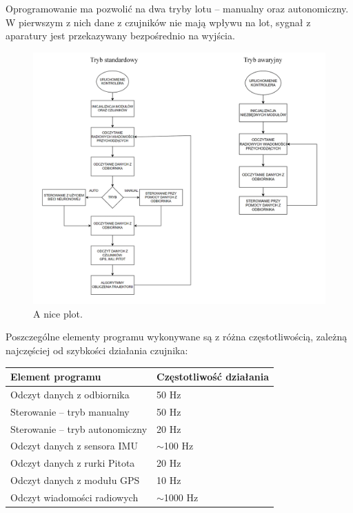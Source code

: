 \documentclass[12pt, a4paper]{article}
\begin{document}
Oprogramowanie ma pozwolić na dwa tryby lotu – manualny oraz autonomiczny. W pierwszym z nich dane z czujników nie mają wpływu na lot, sygnał z aparatury jest przekazywany bezpośrednio na wyjścia.
 
    \begin{figure}[ht]
    \centering
    \includegraphics[width=1\textwidth]{diagramy}
    \caption{A nice plot.}
\end{figure}

Poszczególne elementy programu wykonywane są z różna częstotliwością, zależną najczęściej od szybkości działania czujnika:

\begin{center}

\begin{tabular}{| l | l |}
\hline
Element programu & Częstotliwość działania \\
\hline
Odczyt danych z odbiornika & 50 Hz \\
Sterowanie – tryb manualny & 50 Hz \\
Sterowanie – tryb autonomiczny & 20 Hz \\
Odczyt danych z sensora IMU & $\sim$100 Hz \\
Odczyt danych z rurki Pitota & 20 Hz \\
Odczyt danych z modułu GPS & 10 Hz \\
Odczyt wiadomości radiowych & $\sim$1000 Hz \\
\hline

\end{tabular}

\end{center}
\end{document}
